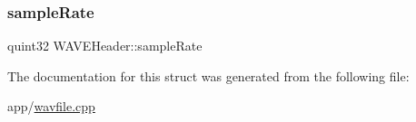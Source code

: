 \hypertarget{struct_w_a_v_e_header_aa4f1b67d3e8e2d455f4f5fbc61c82c2d}{}\label{struct_w_a_v_e_header_aa4f1b67d3e8e2d455f4f5fbc61c82c2d} 
\subsubsection{\texorpdfstring{sample\+Rate}{sampleRate}}
{\footnotesize\ttfamily quint32 W\+A\+V\+E\+Header\+::sample\+Rate}



The documentation for this struct was generated from the following file\+:\begin{DoxyCompactItemize}
\item 
app/\hyperlink{wavfile_8cpp}{wavfile.\+cpp}\end{DoxyCompactItemize}
